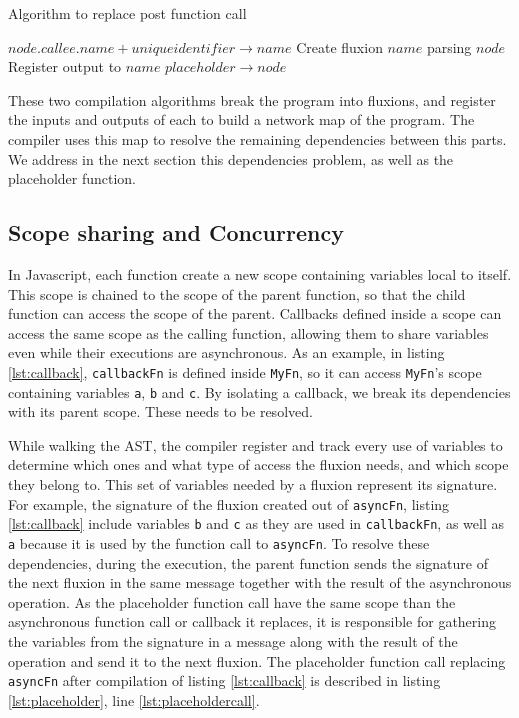 \begin{algorithm}
\caption{Algorithm to replace post function call}
\label{alg:CallExpressionPost}
\begin{algorithmic}[1]
\State $node.callee.name + unique identifier \to name$
\State Create fluxion $name$ parsing $node$ \label{alg:CallExpressionPostCreateFluxion}
\State Register output to $name$
\State $placeholder \to node$ \label{alg:CallExpressionPostPlaceholder}
\EndIf
\EndFunction
\end{algorithmic}
\end{algorithm}

These two compilation algorithms break the program into fluxions, and register the inputs and outputs of each to build a network map of the program.
The compiler uses this map to resolve the remaining dependencies between this parts.
We address in the next section this dependencies problem, as well as the placeholder function.

\subsection{Scope sharing and Concurrency} \label{ss:Scope}

In Javascript, each function create a new scope containing variables local to itself.
This scope is chained to the scope of the parent function, so that the child function can access the scope of the parent.
Callbacks defined inside a scope can access the same scope as the calling function, allowing them to share variables even while their executions are asynchronous.
As an example, in listing \ref{lst:callback}, \texttt{callbackFn} is defined inside \texttt{MyFn}, so it can access \texttt{MyFn}'s scope containing variables \texttt{a}, \texttt{b} and \texttt{c}.
By isolating a callback, we break its dependencies with its parent scope. These needs to be resolved.

While walking the AST, the compiler register and track every use of variables to determine which ones and what type of access the fluxion needs, and which scope they belong to.
This set of variables needed by a fluxion represent its signature.
For example, the signature of the fluxion created out of \texttt{asyncFn}, listing \ref{lst:callback} include variables \texttt{b} and \texttt{c} as they are used in \texttt{callbackFn}, as well as \texttt{a} because it is used by the function call to \texttt{asyncFn}.
To resolve these dependencies, during the execution, the parent function sends the signature of the next fluxion in the same message together with the result of the asynchronous operation.
As the placeholder function call have the same scope than the asynchronous function call or callback it replaces, it is responsible for gathering the variables from the signature in a message along with the result of the operation and send it to the next fluxion.
The placeholder function call replacing \texttt{asyncFn} after compilation of listing \ref{lst:callback} is described in listing \ref{lst:placeholder}, line \ref{lst:placeholdercall}.

